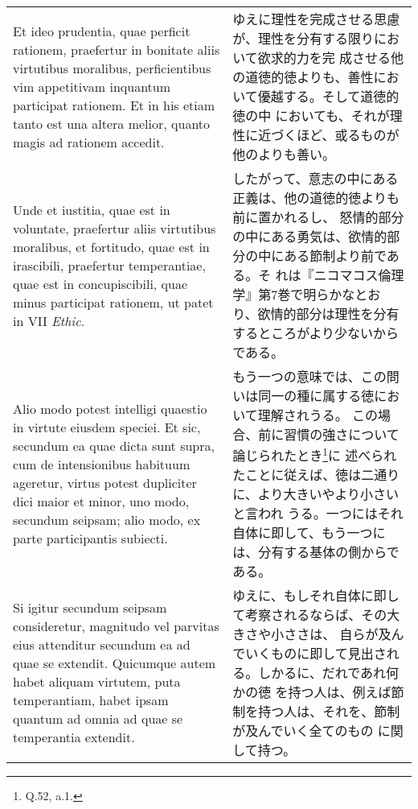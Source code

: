 \documentclass[10pt]{jsarticle}
\begin{document}
\begin{longtable}{p{21em}p{21em}}
\\

 Et ideo prudentia, quae perficit rationem,
 praefertur in bonitate aliis virtutibus moralibus, perficientibus vim
 appetitivam inquantum participat rationem. Et in his etiam tanto est
 una altera melior, quanto magis ad rationem accedit.
 
&

 ゆえに理性を完成させる思慮が、理性を分有する限りにおいて欲求的力を完
 成させる他の道徳的徳よりも、善性において優越する。そして道徳的徳の中
 においても、それが理性に近づくほど、或るものが他のよりも善い。

\\



Unde et iustitia, quae est in voluntate, praefertur aliis virtutibus
 moralibus, et fortitudo, quae est in irascibili, praefertur
 temperantiae, quae est in concupiscibili, quae minus participat
 rationem, ut patet in VII {\itshape Ethic}.
 
&

 したがって、意志の中にある正義は、他の道徳的徳よりも前に置かれるし、
 怒情的部分の中にある勇気は、欲情的部分の中にある節制より前である。そ
 れは『ニコマコス倫理学』第7巻で明らかなとおり、欲情的部分は理性を分有
 するところがより少ないからである。

\\

 Alio modo potest intelligi quaestio in virtute eiusdem speciei. Et
 sic, secundum ea quae dicta sunt supra, cum de intensionibus habituum
 ageretur, virtus potest dupliciter dici maior et minor, uno modo,
 secundum seipsam; alio modo, ex parte participantis subiecti.
 
&

 もう一つの意味では、この問いは同一の種に属する徳において理解されうる。
 この場合、前に習慣の強さについて論じられたとき\footnote{Q.52, a.1.}に
 述べられたことに従えば、徳は二通りに、より大きいやより小さいと言われ
 うる。一つにはそれ自体に即して、もう一つには、分有する基体の側からで
 ある。

\\

 Si igitur secundum seipsam consideretur, magnitudo vel parvitas eius
 attenditur secundum ea ad quae se extendit. Quicumque autem habet
 aliquam virtutem, puta temperantiam, habet ipsam quantum ad omnia ad
 quae se temperantia extendit.
 
&

 ゆえに、もしそれ自体に即して考察されるならば、その大きさや小ささは、
 自らが及んでいくものに即して見出される。しかるに、だれであれ何かの徳
 を持つ人は、例えば節制を持つ人は、それを、節制が及んでいく全てのもの
 に関して持つ。


\end{longtable}
\end{document}
